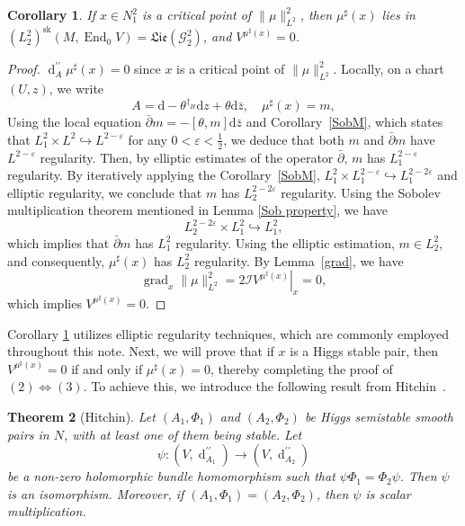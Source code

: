 \documentclass[a4paper]{amsart}
\newtheorem{theorem}{Theorem}[section]
\newtheorem{cor}[theorem]{Corollary}
\theoremstyle{definition}
\theoremstyle{remark}
\numberwithin{equation}{section}
\begin{document}
\begin{cor}\label{cp-reg}
If $x \in N_1^2$ is a critical point of $\|\mu\|^2_{L^2}$, then $\mu^\sharp(x)$ lies in $ (L_2^2)^{\mathrm{sk}}(M, \operatorname{End}_0 V)=\mathfrak{Lie}(\mathscr{G}_2^2)$, and $V^{\mu^\sharp(x)} = 0$.
\end{cor}

\begin{proof}
$\operatorname{d}_A^{\prime\prime} \mu^\sharp(x) = 0$ since $x$ is a critical point of $\|\mu\|^2_{L^2}$. Locally, on a chart $(U, z)$, we write
\[
A = \mathrm{d} - \theta^{\dagger_H}\text{d}z + \theta \text{d}\bar z, \quad \mu^\sharp(x) = m,
\]
Using the local equation $\bar{\partial} m = -[\theta, m]\text{d}\bar z$ and Corollary~\ref{SobM}, which states that $L_1^2 \times L^2 \hookrightarrow L^{2-\varepsilon}$ for any $0 < \varepsilon < \frac{1}{2}$, we deduce that both $m$ and $\bar{\partial} m$ have $L^{2-\varepsilon}$ regularity. Then, by elliptic estimates of the operator $\bar\partial$, $m$ has $L_1^{2-\varepsilon}$ regularity. By iteratively applying the Corollary~\ref{SobM}, $L_1^2 \times L_1^{2-\varepsilon} \hookrightarrow L_1^{2-2\varepsilon}$ and elliptic regularity, we conclude that $m$ has $L_2^{2-2\varepsilon}$ regularity. Using the Sobolev multiplication theorem mentioned in Lemma \ref{Sob property}, we have
\[
L_2^{2-2\varepsilon} \times L_1^2 \hookrightarrow L_1^2,
\]
which implies that $\bar{\partial} m$ has $L_1^2$ regularity. Using the elliptic estimation, $m \in L_2^2$, and consequently, $\mu^\sharp(x)$ has $L_2^2$ regularity. By Lemma~\ref{grad}, we have
\[
\operatorname{grad}_x \|\mu\|^2_{L^2} = \left. 2 \mathcal{I} V^{\mu^\sharp(x)} \right|_x = 0,
\]
which implies $V^{\mu^\sharp(x)} = 0$.
\end{proof}

Corollary \ref{cp-reg} utilizes elliptic regularity techniques, which are commonly employed throughout this note. Next, we will prove that if $x$ is a Higgs stable pair, then $V^{\mu^\sharp(x)} = 0$ if and only if $\mu^\sharp(x) = 0$, thereby completing the proof of $(2) \Leftrightarrow (3)$. To achieve this, we introduce the following result from Hitchin~\cite[Theorem 3.15]{hitchin1987self}. 

\begin{theorem}[Hitchin]\label{Hitchin-315}
Let $(A_1, \Phi_1)$ and $(A_2, \Phi_2)$ be Higgs semistable smooth pairs in $N$, with at least one of them being stable. Let
\[
\psi: (V, \operatorname{d}^{\prime\prime}_{A_1}) \to (V, \operatorname{d}^{\prime\prime}_{A_2})
\]
be a non-zero holomorphic bundle homomorphism such that $\psi \Phi_1 = \Phi_2 \psi$. Then $\psi$ is an isomorphism. Moreover, if $(A_1, \Phi_1) = (A_2, \Phi_2)$, then $\psi$ is scalar multiplication.
\end{theorem}
\end{document}
